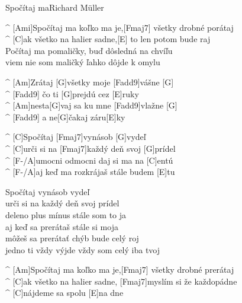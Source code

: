 \begin{song}{Spočítaj ma}{Richard Müller}

\begin{guitar}
^ [Ami]Spočítaj ma koľko ma je,[Fmaj7] všetky drobné porátaj \\
^ [C]ak všetko na halier sadne,[E] to len potom bude raj \\
Počítaj ma pomaličky, buď dôsledná na chvíľu\\
viem nie som maličký ľahko dôjde k omylu \\
\end{guitar}

\begin{guitar}
^ [Am]Zrátaj [G]všetky moje [Fadd9]vášne [G]\\
^ [Fadd9]     čo ti [G]prejdú cez [E]ruky \\
^ [Am]nesta[G]vaj sa ku mne [Fadd9]vlažne [G]\\
^ [Fadd9]   a   ne[G]čakaj záru[E]ky \\
\end{guitar}

\begin{guitar}
^ [C]Spočítaj [Fmaj7]vynásob [G]vydeľ \\
^ [C]urči si na [Fmaj7]každý deň svoj [G]prídel \\
^ [F-/A]umocni odmocni daj si ma na [C]entú \\
^ [F-/A]aj keď ma rozkrájaš stále budem [E]tu \\
\end{guitar}

\begin{guitar}
Spočítaj vynásob vydeľ \\
urči si na každý deň svoj prídel \\
deleno plus mínus stále som to ja \\
aj keď sa prerátaš stále si moja \\
môžeš sa prerátať chýb bude celý roj \\
jedno ti vždy výjde vždy som celý iba tvoj \\
\end{guitar}


\begin{guitar}
^ [Am]Spočítaj ma koľko ma je,[Fmaj7] všetky drobné prerátaj \\
^ [C]ak všetko na halier sadne, [Fmaj7]myslím si že každopádne \\
^ [C]nájdeme sa spolu [E]na dne \\
\end{guitar}

\end{song}
